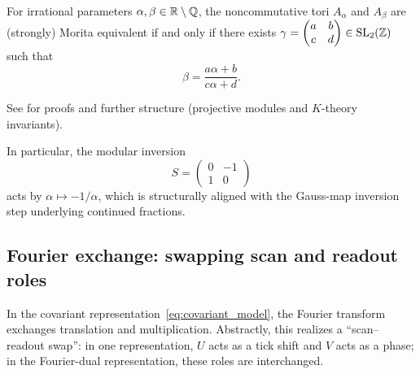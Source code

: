 \begin{theorem}
\label{thm:morita_classification_nct}
For irrational parameters $\alpha,\beta\in\mathbb{R}\setminus\mathbb{Q}$, the noncommutative tori $A_\alpha$ and $A_\beta$ are (strongly) Morita equivalent if and only if there exists $\gamma=\begin{pmatrix}a&b\\c&d\end{pmatrix}\in \mathrm{SL}_2(\mathbb{Z})$ such that
\begin{equation}
\beta=\frac{a\alpha+b}{c\alpha+d}.
\end{equation}
\end{theorem}
\begin{remark}
See \cite{Rieffel1988,Connes1994} for proofs and further structure (projective modules and $K$-theory invariants).
\end{remark}

In particular, the modular inversion
\begin{equation}
S=\begin{pmatrix}0&-1\\1&0\end{pmatrix}
\end{equation}
acts by $\alpha\mapsto -1/\alpha$, which is structurally aligned with the Gauss-map inversion step underlying continued fractions.

\subsection{Fourier exchange: swapping scan and readout roles}
\label{sec:fourier_exchange_weyl}

In the covariant representation~\eqref{eq:covariant_model}, the Fourier transform exchanges translation and multiplication. Abstractly, this realizes a ``scan--readout swap'': in one representation, $U$ acts as a tick shift and $V$ acts as a phase; in the Fourier-dual representation, these roles are interchanged.

